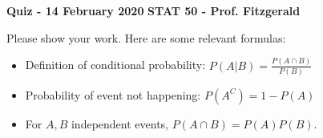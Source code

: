 \documentclass[12pt, addpoints]{exam}
\begin{document}
\textbf{Quiz - 14 February 2020}
\hfill
\textbf{STAT 50 - Prof. Fitzgerald}

\vspace{10mm}
 

\vspace{5mm}

Please show your work. Here are some relevant formulas:

\begin{itemize}
\item
Definition of conditional probability:
$P(A | B) = \frac{P(A \cap B)}{P(B)}$

\item
Probability of event not happening:
$P(A^C) = 1 - P(A)$

\item
For $A,B$ independent events,
$P(A \cap B) = P(A) P(B)$.
\end{itemize}
\end{document}
